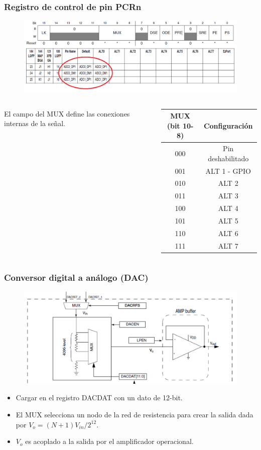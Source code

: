 \documentclass[10.5pt,scale=1.0,t,aspectratio=169,hyperref={pdfpagelabels=false}]{beamer}
\begin{document}
\begin{frame}
	\frametitle{Registro de control de pin PCRn}
	\begin{figure}
		\centering
		\includegraphics[scale=0.4]{fig_PCR2}
	\end{figure}
	\begin{columns}
		El campo del MUX define las conexiones internas de la señal.
		\begin{scriptsize}
			\begin{tabular}{ cc } 
				\hline
				\textbf{MUX (bit 10-8)} & \textbf{Configuración}  \\ 
				\hline
				000 & Pin deshabilitado  \\ 
				001 & ALT 1 - GPIO \\ 
				010 & ALT 2 \\ 
				011 & ALT 3 \\ 
				100 & ALT 4 \\ 
				101 & ALT 5 \\ 
				110 & ALT 6 \\ 
				111 & ALT 7 \\ 
				\hline
			\end{tabular}
		\end{scriptsize}
	\end{columns}
\end{frame}
\begin{frame}
	\frametitle{Conversor digital a análogo (DAC)}
	\begin{figure}
		\centering
		\includegraphics[scale=0.25]{fig_DACSchematic}
	\end{figure}
	\begin{itemize}
		\item Cargar en el registro DACDAT con un dato de 12-bit.
		\item El MUX selecciona un nodo de la red de resistencia para crear la salida dada por $V_o = (N+1)V_{in}/2^{12}$.
		\item $V_o$ es acoplado a la salida por el amplificador operacional. 
	\end{itemize}
\end{frame}
\end{document}
